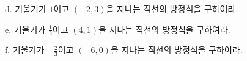 \documentclass[a4paper]{oblivoir}
\newlength{\frameheight}
\begin{document}
\newpage
\par\bigskip
d. 기울기가 $1$이고 $(-2,3)$을 지나는 직선의 방정식을 구하여라.\par
\begin{minipage}{0.45\textwidth}\centering
\par\bigskip\begin{mdframed}[frametitle=중학교 방식의 풀이]
\vspace{\frameheight}
\end{mdframed}
\end{minipage}
\begin{minipage}{0.45\textwidth}\centering
\par\bigskip\begin{mdframed}[frametitle=공식을 사용한 풀이]
\vspace{\frameheight}
\end{mdframed}
\end{minipage}\bigskip\bigskip\par
\par\bigskip
e. 기울기가 $\frac12$이고 $(4,1)$을 지나는 직선의 방정식을 구하여라.\par
\begin{minipage}{0.45\textwidth}\centering
\par\bigskip\begin{mdframed}[frametitle=중학교 방식의 풀이]
\vspace{\frameheight}
\end{mdframed}
\end{minipage}
\begin{minipage}{0.45\textwidth}\centering
\par\bigskip\begin{mdframed}[frametitle=공식을 사용한 풀이]
\vspace{\frameheight}
\end{mdframed}
\end{minipage}\bigskip\bigskip\par
\par\bigskip
f. 기울기가 $-\frac23$이고 $(-6,0)$을 지나는 직선의 방정식을 구하여라.\par
\begin{minipage}{0.45\textwidth}\centering
\par\bigskip\begin{mdframed}[frametitle=중학교 방식의 풀이]
\vspace{\frameheight}
\end{mdframed}
\end{minipage}
\begin{minipage}{0.45\textwidth}\centering
\par\bigskip\begin{mdframed}[frametitle=공식을 사용한 풀이]
\vspace{\frameheight}
\end{mdframed}
\end{minipage}\bigskip\bigskip\par
\end{document}
